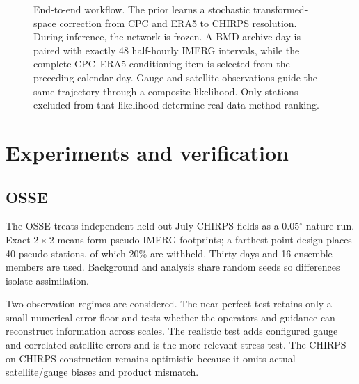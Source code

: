 \documentclass[10pt,twocolumn]{article}
\begin{document}
\begin{figure}[t]
{
}
\caption{End-to-end workflow. The prior learns a stochastic transformed-space correction from CPC and ERA5 to CHIRPS resolution. During inference, the network is frozen. A BMD archive day is paired with exactly 48 half-hourly IMERG intervals, while the complete CPC--ERA5 conditioning item is selected from the preceding calendar day. Gauge and satellite observations guide the same trajectory through a composite likelihood. Only stations excluded from that likelihood determine real-data method ranking.}
\label{fig:workflow}
\end{figure}

\section{Experiments and verification}

\subsection{OSSE}

The OSSE treats independent held-out July CHIRPS fields as a 0.05$^\circ$ nature run. Exact $2\times2$ means form pseudo-IMERG footprints; a farthest-point design places 40 pseudo-stations, of which 20\% are withheld. Thirty days and 16 ensemble members are used. Background and analysis share random seeds so differences isolate assimilation.

Two observation regimes are considered. The near-perfect test retains only a small numerical error floor and tests whether the operators and guidance can reconstruct information across scales. The realistic test adds configured gauge and correlated satellite errors and is the more relevant stress test. The CHIRPS-on-CHIRPS construction remains optimistic because it omits actual satellite/gauge biases and product mismatch.
\end{document}
